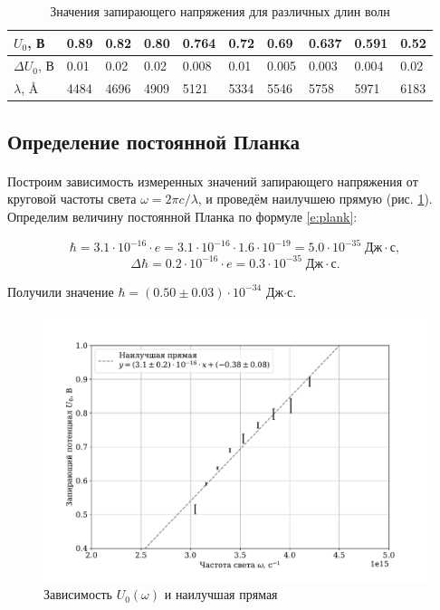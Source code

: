 \documentclass[a4paper,12pt]{article}
\begin{document}
\begin{table}[h]
\centering
\begin{tabular}{|l|l|l|l|l|l|l|l|l|l|}
\hline
$U_0$, В        & 0.89 & 0.82 & 0.80 & 0.764 & 0.72 & 0.69  & 0.637 & 0.591 & 0.52 \\ \hline
$\Delta U_0$, В & 0.01 & 0.02 & 0.02 & 0.008 & 0.01 & 0.005 & 0.003 & 0.004 & 0.02 \\ \hline
$\lambda$, Å    & 4484 & 4696 & 4909 & 5121  & 5334 & 5546  & 5758  & 5971  & 6183 \\ \hline
\end{tabular}
\caption{Значения запирающего напряжения для различных длин волн}
\label{tab:u_zeros}
\end{table}

\subsection{Определение постоянной Планка}

\paragraph{} Построим зависимость измеренных значений запирающего напряжения от круговой частоты света $\omega = 2\pi c/\lambda$, и проведём наилучшею прямую (рис. \ref{fig:plot_plank}). Определим величину постоянной Планка по формуле \eqref{e:plank}:

\[
\hbar = 3.1 \cdot 10^{-16} \cdot e = 3.1 \cdot 10^{-16} \cdot 1.6 \cdot 10^{-19} = 5.0 \cdot 10^{-35} \; \text{Дж} \cdot \text{с},
\]\[
\Delta \hbar = 0.2 \cdot 10^{-16} \cdot e = 0.3 \cdot 10^{-35} \; \text{Дж} \cdot \text{с}.
\]

\noindent Получили значение $\hbar = (0.50 \pm 0.03) \cdot 10^{-34}$ Дж$\cdot$с.

\begin{figure}[h]
\centering
\includegraphics[width=\textwidth]{plot_plank.pdf}
\caption{Зависимость $U_0(\omega)$ и наилучшая прямая}
\label{fig:plot_plank}
\end{figure}
\end{document}
